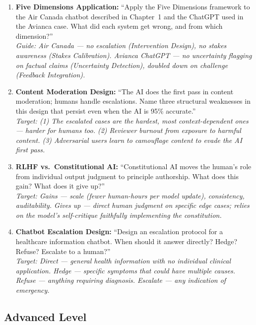 \begin{enumerate}
    \item \textbf{Five Dimensions Application:} ``Apply the Five Dimensions framework to the Air Canada chatbot described in Chapter~1 and the ChatGPT used in the Avianca case. What did each system get wrong, and from which dimension?''\\
    \textit{Guide: Air Canada --- no escalation (Intervention Design), no stakes awareness (Stakes Calibration). Avianca ChatGPT --- no uncertainty flagging on factual claims (Uncertainty Detection), doubled down on challenge (Feedback Integration).}

    \item \textbf{Content Moderation Design:} ``The AI does the first pass in content moderation; humans handle escalations. Name three structural weaknesses in this design that persist even when the AI is 95\% accurate.''\\
    \textit{Target: (1) The escalated cases are the hardest, most context-dependent ones --- harder for humans too. (2) Reviewer burnout from exposure to harmful content. (3) Adversarial users learn to camouflage content to evade the AI first pass.}

    \item \textbf{RLHF vs.\ Constitutional AI:} ``Constitutional AI moves the human's role from individual output judgment to principle authorship. What does this gain? What does it give up?''\\
    \textit{Target: Gains --- scale (fewer human-hours per model update), consistency, auditability. Gives up --- direct human judgment on specific edge cases; relies on the model's self-critique faithfully implementing the constitution.}

    \item \textbf{Chatbot Escalation Design:} ``Design an escalation protocol for a healthcare information chatbot. When should it answer directly? Hedge? Refuse? Escalate to a human?''\\
    \textit{Target: Direct --- general health information with no individual clinical application. Hedge --- specific symptoms that could have multiple causes. Refuse --- anything requiring diagnosis. Escalate --- any indication of emergency.}
\end{enumerate}

\subsection{Advanced Level}

